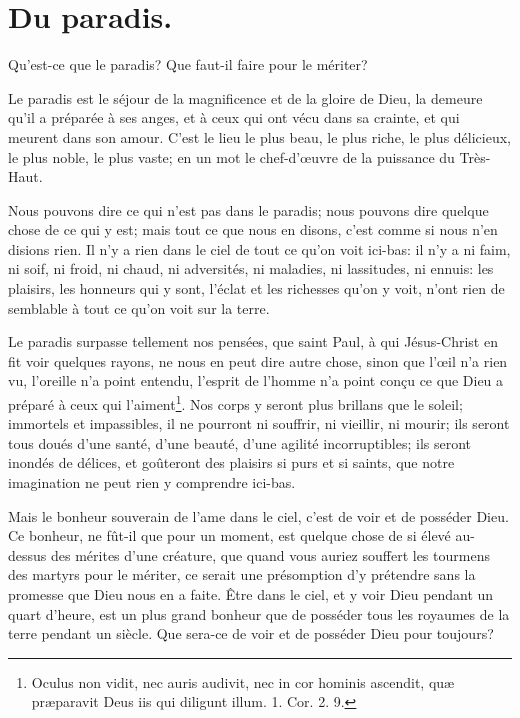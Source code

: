 \documentclass[instructions.tex]{subfiles}
\begin{document}
 
\chapter{Du paradis.}
 
Qu’est-ce que le paradis? Que faut-il faire pour le mériter?
 
\primo Le paradis est le séjour de la magnificence et de la gloire de Dieu, la demeure qu’il a préparée à ses anges, et à ceux qui ont vécu dans sa crainte, et qui meurent dans son amour. C’est le lieu le plus beau, le plus riche, le plus délicieux, le plus noble, le plus vaste; en un mot le chef-d’œuvre de la puissance du Très-Haut.
 
Nous pouvons dire ce qui n’est pas dans le paradis; nous pouvons dire quelque chose de ce qui y est; mais tout ce que nous en disons, c’est comme si nous n’en disions rien. Il n’y a rien dans le ciel de tout ce qu’on voit ici-bas: il n’y a ni faim, ni soif, ni froid, ni chaud, ni adversités, ni maladies, ni lassitudes, ni ennuis: les plaisirs, les honneurs qui y sont, l’éclat et les richesses qu’on y voit, n’ont rien de semblable à tout ce qu’on voit sur la terre.
 
Le paradis surpasse tellement nos pensées, que saint Paul, à qui Jésus-Christ en fit voir quelques rayons, ne nous en peut dire autre chose, sinon que l’œil n’a rien vu, l’oreille n’a point entendu, l’esprit de l’homme n’a point conçu ce que Dieu a préparé à ceux qui l’aiment\footnote{Oculus non vidit, nec auris audivit, nec in cor hominis ascendit, quæ præparavit Deus iis qui diligunt illum. 1. Cor. 2. 9.}. Nos corps y seront plus brillans que le soleil; immortels et impassibles, il ne pourront ni souffrir, ni vieillir, ni mourir; ils seront tous doués d’une santé, d’une beauté, d’une agilité incorruptibles; ils seront inondés de délices, et goûteront des plaisirs si purs et si saints, que notre imagination ne peut rien y comprendre ici-bas.
 
Mais le bonheur souverain de l’ame dans le ciel, c’est de voir et de posséder Dieu. Ce bonheur, ne fût-il que pour un moment, est quelque chose de si élevé au-dessus des mérites d’une créature, que quand vous auriez souffert les tourmens des martyrs pour le mériter, ce serait une présomption d’y prétendre sans la promesse que Dieu nous en a faite. Être dans le ciel, et y voir Dieu pendant un quart d’heure, est un plus grand bonheur que de posséder tous les royaumes de la terre pendant un siècle. Que sera-ce de voir et de posséder Dieu pour toujours?
 
\end{document}
